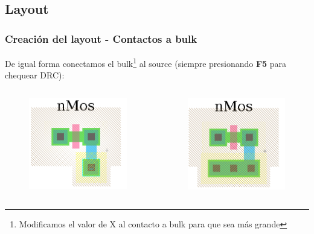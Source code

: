 \documentclass{beamer}
\begin{document}
\begin{frame}
\subsection{Layout}
\frametitle{Creación del layout - Contactos a bulk}
De igual forma conectamos el bulk\footnote{Modificamos el valor de X al contacto a bulk para que sea más grande} al source (siempre presionando \textbf{F5} para chequear DRC):
\begin{columns}
\begin{figure}
  \includegraphics[width=0.89\linewidth]{figuras/edicionElectric-9.png}
\end{figure}
\begin{figure}
  \includegraphics[width=0.89\linewidth]{figuras/edicionElectric-9a.png}
\end{figure}

\end{columns}

\end{frame}
\end{document}
